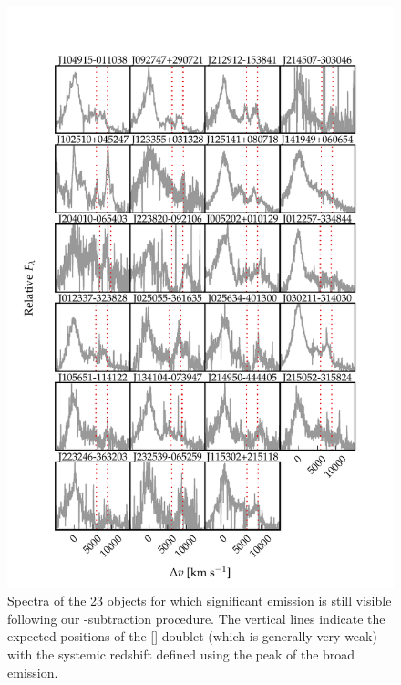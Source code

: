 \begin{figure}
    \centering
    \includegraphics[width=\columnwidth]{figures/chapter04/example_spectrum_grid_extreme_fe.pdf} 
    \caption[{Spectra of the 23 objects for which significant  emission is still visible following our -subtraction procedure.}]{Spectra of the 23 objects for which significant  emission is still visible following our -subtraction procedure. The vertical lines indicate the expected positions of the [] doublet (which is generally very weak) with the systemic redshift defined using the peak of the broad \hb emission. }     
    \label{fig:bad_fe}
\end{figure}

